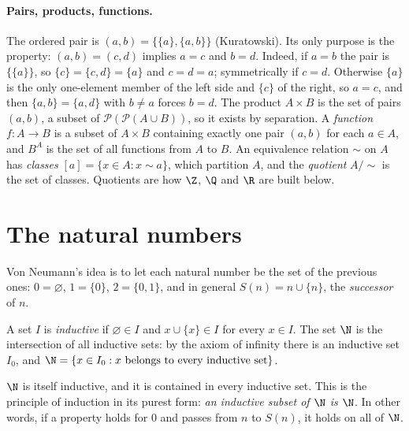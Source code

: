 \paragraph{Pairs, products, functions.} The ordered pair is $(a,b)=\{\{a\},\{a,b\}\}$ (Kuratowski). Its only purpose is
the property: $(a,b)=(c,d)$ implies $a=c$ and $b=d$. Indeed, if $a=b$ the pair is $\{\{a\}\}$, so $\{c\}=\{c,d\}=\{a\}$ and
$c=d=a$; symmetrically if $c=d$. Otherwise $\{a\}$ is the only one-element member of the left side and $\{c\}$ of the
right, so $a=c$, and then $\{a,b\}=\{a,d\}$ with $b\ne a$ forces $b=d$. The product $A\times B$ is the set of pairs
$(a,b)$, a subset of $\mathcal P(\mathcal P(A\cup B))$, so it exists by separation. A \emph{function} $f:A\to B$ is a subset of
$A\times B$ containing exactly one pair $(a,b)$ for each $a\in A$, and $B^A$ is the set of all functions from $A$ to $B$.
An equivalence relation $\sim$ on $A$ has \emph{classes} $[a]=\{x\in A:x\sim a\}$, which partition $A$, and the
\emph{quotient} $A/{\sim}$ is the set of classes. Quotients are how $\Z$, $\Q$ and $\R$ are built below.

\section{The natural numbers}\label{sec:naturals}

Von Neumann's idea is to let each natural number be the set of the previous ones: $0=\varnothing$, $1=\{0\}$,
$2=\{0,1\}$, and in general $S(n)=n\cup\{n\}$, the \emph{successor} of $n$.

\begin{definition}
A set $I$ is \emph{inductive} if $\varnothing\in I$ and $x\cup\{x\}\in I$ for every $x\in I$. The set $\N$ is the intersection of all
inductive sets: by the axiom of infinity there is an inductive set $I_0$, and $\N=\{x\in I_0:x\text{ belongs to every inductive set}\}$.
\end{definition}

$\N$ is itself inductive, and it is contained in every inductive set. This is the principle of induction in its
purest form: \emph{an inductive subset of $\N$ is $\N$}. In other words, if a property holds for $0$ and passes from $n$
to $S(n)$, it holds on all of $\N$.


